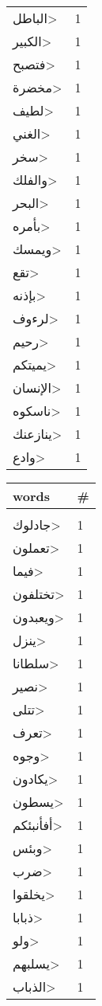 \documentclass{article}
\begin{document}
\begin{multicols}{6}
\begin{center}
\begin{tabular}{ P{2cm}  P{1cm}}
\<الباطل> & 1 \\ 
\<الكبير> & 1 \\ 
\<فتصبح> & 1 \\ 
\<مخضرة> & 1 \\ 
\<لطيف> & 1 \\ 
\<الغني> & 1 \\ 
\<سخر> & 1 \\ 
\<والفلك> & 1 \\ 
\<البحر> & 1 \\ 
\<بأمره> & 1 \\ 
\<ويمسك> & 1 \\ 
\<تقع> & 1 \\ 
\<بإذنه> & 1 \\ 
\<لرءوف> & 1 \\ 
\<رحيم> & 1 \\ 
\<يميتكم> & 1 \\ 
\<الإنسان> & 1 \\ 
\<ناسكوه> & 1 \\ 
\<ينازعنك> & 1 \\ 
\<وادع> & 1 \\ 
\end{tabular} 
\begin{tabular}{ P{2cm}  P{1cm}} 
\textbf{words}    & \textbf{\#}  \\
\hline
\\[0.01cm]
\<جادلوك> & 1 \\ 
\<تعملون> & 1 \\ 
\<فيما> & 1 \\ 
\<تختلفون> & 1 \\ 
\<ويعبدون> & 1 \\ 
\<ينزل> & 1 \\ 
\<سلطانا> & 1 \\ 
\<نصير> & 1 \\ 
\<تتلى> & 1 \\ 
\<تعرف> & 1 \\ 
\<وجوه> & 1 \\ 
\<يكادون> & 1 \\ 
\<يسطون> & 1 \\ 
\<أفأنبئكم> & 1 \\ 
\<وبئس> & 1 \\ 
\<ضرب> & 1 \\ 
\<يخلقوا> & 1 \\ 
\<ذبابا> & 1 \\ 
\<ولو> & 1 \\ 
\<يسلبهم> & 1 \\ 
\<الذباب> & 1 \\ 

\end{tabular}
\end{center}
\end{multicols}
\end{document}
